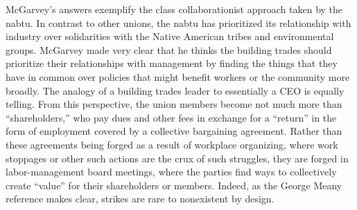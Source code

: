 \sloppy
McGarvey’s answers exemplify the class collaborationist approach taken by the \acrshort{nabtu}. In contrast to other unions, the \acrshort{nabtu} has prioritized its relationship with industry over solidarities with the Native American tribes and environmental groups. McGarvey made very clear that he thinks the building trades should prioritize their relationships with management by finding the things that they have in common over policies that might benefit workers or the community more broadly. The analogy of a building trades leader to essentially a CEO is equally telling. From this perspective, the union members become not much more than “shareholders,” who pay dues and other fees in exchange for a “return” in the form of employment covered by a collective bargaining agreement. Rather than these agreements being forged as a result of workplace organizing, where work stoppages or other such actions are the crux of such struggles, they are forged in labor-management board meetings, where the parties find ways to collectively create “value” for their shareholders or members. Indeed, as the George Meany reference makes clear, strikes are rare to nonexistent by design.
\sloppypar


% 

